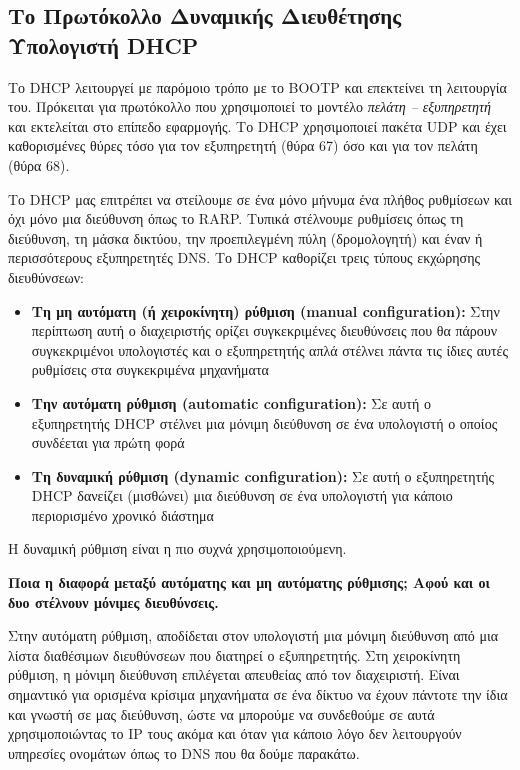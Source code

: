 %
%
\setcounter{subsection}{1}
\subsection{Το Πρωτόκολλο Δυναμικής Διευθέτησης Υπολογιστή DHCP}

Το DHCP λειτουργεί με παρόμοιο τρόπο με το BOOTP και επεκτείνει τη λειτουργία του. Πρόκειται για πρωτόκολλο που χρησιμοποιεί το μοντέλο \emph{πελάτη -- εξυπηρετητή} και εκτελείται στο επίπεδο εφαρμογής. Το DHCP χρησιμοποιεί πακέτα UDP και έχει καθορισμένες θύρες τόσο για τον εξυπηρετητή (θύρα 67) όσο και για τον πελάτη (θύρα 68).

Το DHCP μας επιτρέπει να στείλουμε σε ένα μόνο  μήνυμα ένα πλήθος ρυθμίσεων και όχι μόνο μια διεύθυνση όπως το RARP. Τυπικά στέλνουμε ρυθμίσεις όπως τη διεύθυνση, τη μάσκα δικτύου, την προεπιλεγμένη πύλη (δρομολογητή) και έναν ή περισσότερους εξυπηρετητές DNS. Το DHCP καθορίζει τρεις τύπους εκχώρησης διευθύνσεων:

\begin{itemize}
\item \textbf{Τη μη αυτόματη (ή χειροκίνητη) ρύθμιση (manual configuration):} Στην περίπτωση αυτή ο διαχειριστής ορίζει συγκεκριμένες διευθύνσεις που θα πάρουν συγκεκριμένοι υπολογιστές και ο εξυπηρετητής απλά στέλνει πάντα τις ίδιες αυτές ρυθμίσεις στα συγκεκριμένα μηχανήματα
\item \textbf{Την αυτόματη ρύθμιση (automatic configuration):} Σε αυτή ο εξυπηρετητής DHCP στέλνει μια μόνιμη διεύθυνση σε ένα υπολογιστή ο οποίος συνδέεται για πρώτη φορά
\item \textbf{Τη δυναμική ρύθμιση (dynamic configuration):} Σε αυτή ο εξυπηρετητής DHCP δανείζει (μισθώνει) μια διεύθυνση σε ένα υπολογιστή για κάποιο περιορισμένο χρονικό διάστημα
\end{itemize}

Η δυναμική ρύθμιση είναι η πιο συχνά χρησιμοποιούμενη.

\begin{inthebox}
\textbf{Ποια η διαφορά μεταξύ αυτόματης και μη αυτόματης ρύθμισης; Αφού και οι δυο στέλνουν μόνιμες διευθύνσεις.}

Στην αυτόματη ρύθμιση, αποδίδεται στον υπολογιστή μια μόνιμη διεύθυνση από μια λίστα διαθέσιμων διευθύνσεων που διατηρεί ο εξυπηρετητής. Στη χειροκίνητη ρύθμιση, η μόνιμη διεύθυνση επιλέγεται απευθείας από τον διαχειριστή. Είναι σημαντικό για ορισμένα κρίσιμα μηχανήματα σε ένα δίκτυο να έχουν πάντοτε την ίδια και γνωστή σε μας διεύθυνση, ώστε να μπορούμε να συνδεθούμε σε αυτά χρησιμοποιώντας το IP τους ακόμα και όταν για κάποιο λόγο δεν λειτουργούν υπηρεσίες ονομάτων όπως το DNS που θα δούμε παρακάτω.\\
\end{inthebox}

